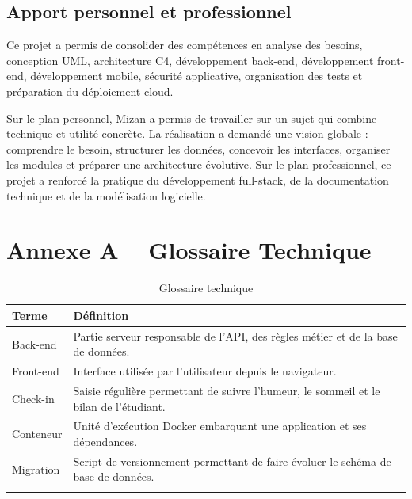 \documentclass{rapportENSET}
\begin{document}
\subsection*{Apport personnel et professionnel}
Ce projet a permis de consolider des compétences en analyse des besoins, conception UML, architecture C4, développement back-end, développement front-end, développement mobile, sécurité applicative, organisation des tests et préparation du déploiement cloud.

Sur le plan personnel, Mizan a permis de travailler sur un sujet qui combine technique et utilité concrète. La réalisation a demandé une vision globale : comprendre le besoin, structurer les données, concevoir les interfaces, organiser les modules et préparer une architecture évolutive. Sur le plan professionnel, ce projet a renforcé la pratique du développement full-stack, de la documentation technique et de la modélisation logicielle.


\newpage
\section*{Annexe A -- Glossaire Technique}
\begin{longtable}{@{}L{0.25\textwidth}L{0.65\textwidth}@{}}
\toprule
\textbf{Terme} & \textbf{Définition} \\
\midrule
\endhead
Back-end & Partie serveur responsable de l'API, des règles métier et de la base de données. \\
Front-end & Interface utilisée par l'utilisateur depuis le navigateur. \\
Check-in & Saisie régulière permettant de suivre l'humeur, le sommeil et le bilan de l'étudiant. \\
Conteneur & Unité d'exécution Docker embarquant une application et ses dépendances. \\
Migration & Script de versionnement permettant de faire évoluer le schéma de base de données. \\
\bottomrule
\caption{Glossaire technique}
\end{longtable}

\end{document}

